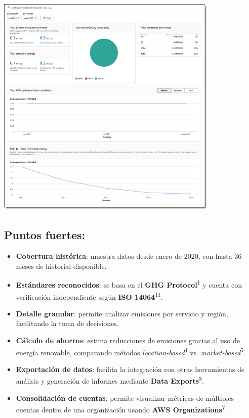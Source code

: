 \documentclass[12pt,a4paper]{report}
\begin{document}
\begin{center}
\includegraphics[width=0.8\textwidth]{imagenes/AWS_1.png}
\end{center}

\subsection*{Puntos fuertes:}

\begin{itemize}
  \item \textbf{Cobertura histórica}: muestra datos desde enero de 2020, con hasta 36 meses de historial disponible.
  \item \textbf{Estándares reconocidos}: se basa en el \textbf{GHG Protocol}\textsuperscript{1} y cuenta con verificación independiente según \textbf{ISO 14064}\textsuperscript{11}.
  \item \textbf{Detalle granular}: permite analizar emisiones por servicio y región, facilitando la toma de decisiones.
  \item \textbf{Cálculo de ahorros}: estima reducciones de emisiones gracias al uso de energía renovable, comparando métodos \textit{location-based}\textsuperscript{4} vs. \textit{market-based}\textsuperscript{5}.
  \item \textbf{Exportación de datos}: facilita la integración con otras herramientas de análisis y generación de informes mediante \textbf{Data Exports}\textsuperscript{8}.
  \item \textbf{Consolidación de cuentas}: permite visualizar métricas de múltiples cuentas dentro de una organización usando \textbf{AWS Organizations}\textsuperscript{7}.
\end{itemize}
\end{document}
